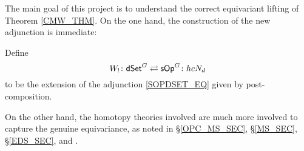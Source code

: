 \documentclass[a4paper,10pt
,draft
]{article}%
\renewcommand{\1}{\eta}%
\begin{document}
The main goal of this project \cite{BP_geo,BP_edss,Per18} is to understand the correct equivariant lifting of Theorem \ref{CMW_THM}.
On the one hand, the construction of the new adjunction is immediate:

\begin{definition}
      Define
      \[
            W_! \colon \mathsf{dSet}^G \rightleftarrows \mathsf{sOp}^G \colon hcN_d
      \]
      to be the
      extension of the adjunction \eqref{SOPDSET_EQ}
      given by post-composition.
\end{definition}



On the other hand, the homotopy theories involved are much more involved to capture the genuine equivariance,
as noted in \S \ref{OPC_MS_SEC}, \S \ref{MS_SEC}, \S \ref{EDS_SEC}, and \cite{Per18}.

\end{document}
